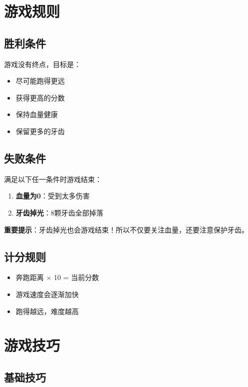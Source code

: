 \documentclass[12pt,a4paper]{article}
\begin{document}
\section{游戏规则}

\subsection{胜利条件}

游戏没有终点，目标是：
\begin{itemize}
  \item 尽可能跑得更远
  \item 获得更高的分数
  \item 保持血量健康
  \item 保留更多的牙齿
\end{itemize}

\subsection{失败条件}

满足以下任一条件时游戏结束：

\begin{enumerate}
  \item \textbf{血量为0}：受到太多伤害
  \item \textbf{牙齿掉光}：8颗牙齿全部掉落
\end{enumerate}

\begin{tipbox}
\textbf{重要提示}：牙齿掉光也会游戏结束！所以不仅要关注血量，还要注意保护牙齿。
\end{tipbox}

\subsection{计分规则}

\begin{itemize}
  \item 奔跑距离 $\times$ 10 = 当前分数
  \item 游戏速度会逐渐加快
  \item 跑得越远，难度越高
\end{itemize}

\section{游戏技巧}

\subsection{基础技巧}
\end{document}
